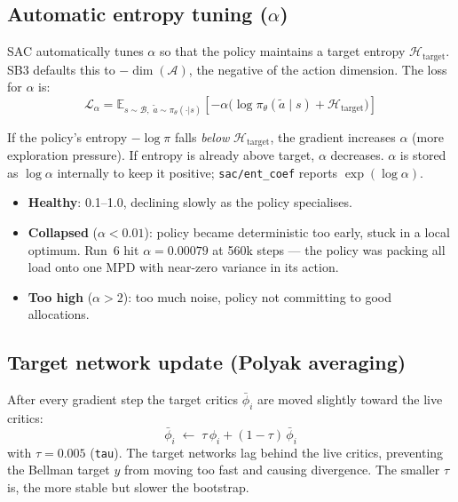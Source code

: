 \documentclass[11pt]{article}
\begin{document}
\subsection*{Automatic entropy tuning ($\alpha$)}

SAC automatically tunes $\alpha$ so that the policy maintains a target entropy
$\mathcal{H}_{\text{target}}$.  SB3 defaults this to $-\dim(\mathcal{A})$, the
negative of the action dimension.
The loss for $\alpha$ is:
\begin{equation}
  \mathcal{L}_{\alpha}
  = \mathbb{E}_{s \sim \mathcal{B},\; \tilde{a} \sim \pi_\theta(\cdot|s)}
    \!\left[
      -\alpha
      \bigl(
        \log \pi_\theta(\tilde{a} \mid s) + \mathcal{H}_{\text{target}}
      \bigr)
    \right]
  \label{eq:alpha_loss}
\end{equation}

If the policy's entropy $-\log \pi$ falls \emph{below} $\mathcal{H}_{\text{target}}$,
the gradient increases $\alpha$ (more exploration pressure).
If entropy is already above target, $\alpha$ decreases.
$\alpha$ is stored as $\log\alpha$ internally to keep it positive;
\texttt{sac/ent\_coef} reports $\exp(\log\alpha)$.

\begin{itemize}
  \item \textbf{Healthy}: 0.1--1.0, declining slowly as the policy specialises.
  \item \textbf{Collapsed} ($\alpha < 0.01$): policy became deterministic too early,
        stuck in a local optimum.  Run~6 hit $\alpha = 0.00079$ at 560k steps ---
        the policy was packing all load onto one MPD with near-zero variance in
        its action.
  \item \textbf{Too high} ($\alpha > 2$): too much noise, policy not committing
        to good allocations.
\end{itemize}

\subsection*{Target network update (Polyak averaging)}

After every gradient step the target critics $\bar\phi_i$ are moved slightly
toward the live critics:
\begin{equation}
  \bar\phi_i \;\leftarrow\; \tau\,\phi_i + (1-\tau)\,\bar\phi_i
  \label{eq:polyak}
\end{equation}
with $\tau = 0.005$ (\texttt{tau}).  The target networks lag behind the live
critics, preventing the Bellman target $y$ from moving too fast and causing
divergence.  The smaller $\tau$ is, the more stable but slower the bootstrap.
\end{document}

